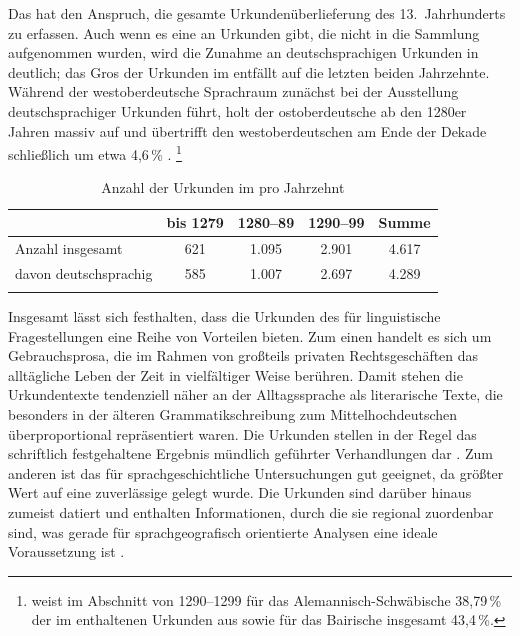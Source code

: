 Das \CAO{} hat den Anspruch, die gesamte
Urkundenüberlieferung des 13.~Jahrhunderts zu
erfassen. Auch wenn es eine  an Urkunden gibt, die nicht in die
Sammlung aufgenommen wurden, wird die Zunahme an deutschsprachigen Urkunden in
 deutlich; das Gros der Urkunden im \CAO{} entfällt auf die
letzten beiden Jahrzehnte. Während der westoberdeutsche
Sprachraum zunächst bei der Ausstellung deutschsprachiger
Urkunden führt, holt der ostoberdeutsche ab den 1280er Jahren
massiv auf und übertrifft den westoberdeutschen am Ende der
Dekade schließlich um etwa 4,6\,\% \autocite[46--47]{ganslmayer2012}.%
%
	\footnote{\citet[47]{ganslmayer2012} weist im Abschnitt von 1290--1299 für
		das Alemannisch-Schwäbische 38,79\,\%
		der im \CAO{} enthaltenen Urkunden aus sowie für das
		Bairische insgesamt 43,4\,\%. }

\begin{table}
\centering
\caption{Anzahl der Urkunden im 
pro Jahrzehnt \autocite[40]{ganslmayer2012}}
\begin{tabularx}{\textwidth}{l C C C C}
\lsptoprule
%
	& {bis 1279}
	& {1280--89}
	& {1290--99}
	& {Summe}\\

\midrule

Anzahl insgesamt
	& 621
	& 1.095
	& 2.901
	& 4.617
	\\

davon deutschsprachig
	& 585
	& 1.007
	& 2.697
	& 4.289
	\\

\lspbottomrule
\end{tabularx}
\label{tab:urkstat}
\end{table}

Insgesamt lässt sich festhalten, dass die Urkunden des \CAO{} für
linguistische Fragestellungen eine Reihe von Vorteilen bieten. Zum einen
handelt es sich um Gebrauchsprosa, die im Rahmen
von großteils privaten Rechtsgeschäften das alltägliche Leben der Zeit in
vielfältiger Weise berühren. Damit stehen die Urkundentexte tendenziell näher
an der Alltagssprache als literarische Texte, die besonders in der älteren
Grammatikschreibung zum Mittelhochdeutschen überproportional repräsentiert
waren. Die Urkunden stellen in der Regel das schriftlich
festgehaltene Ergebnis mündlich geführter Verhandlungen dar
\autocite[595]{schmidtwiegand1998b}. Zum anderen ist das \CAO{} für
sprachgeschichtliche Untersuchungen gut geeignet, da
größter Wert auf eine zuverlässige  gelegt wurde. Die
Urkunden sind darüber hinaus zumeist datiert und enthalten Informationen, durch
die sie regional zuordenbar sind, was gerade für
sprachgeografisch orientierte Analysen eine ideale
Voraussetzung ist
\autocites{wmuovz}[Schreibortverzeichnis]{cao-online}[22]{schulze2011}.

